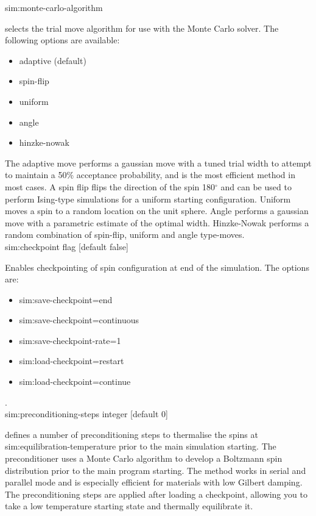 {\zicf sim:monte-carlo-algorithm} selects the trial move algorithm for use with the Monte Carlo solver. The following options are available:
\begin{itemize}
  \item[] adaptive (default)
  \item[] spin-flip
  \item[] uniform
  \item[] angle
  \item[] hinzke-nowak
\end{itemize}
The adaptive move performs a gaussian move with a tuned trial width to attempt to maintain a 50\% acceptance probability, and is the most efficient method in most cases. A spin flip flips the direction of the spin 180$^{\circ}$ and can be used to perform Ising-type simulations for a uniform starting configuration. Uniform moves a spin to a random location on the unit sphere. Angle performs a gaussian move with a parametric estimate of the optimal width. Hinzke-Nowak performs a random combination of spin-flip, uniform and angle type-moves.\\

{\zicf sim:checkpoint flag [default false]}
    Enables checkpointing of spin configuration at end of the simulation. The options are:

\begin{itemize}
  \item[] sim:save-checkpoint=end
  \item[] sim:save-checkpoint=continuous
  \item[] sim:save-checkpoint-rate=1
  \item[] sim:load-checkpoint=restart
  \item[] sim:load-checkpoint=continue
\end{itemize}
.\\

{\zicf sim:preconditioning-steps
    integer [default 0]}
    defines a number of preconditioning steps to thermalise the spins at
    sim:equilibration-temperature prior to the main simulation starting. The
    preconditioner uses a Monte Carlo algorithm to develop a Boltzmann spin
    distribution prior to the main program starting. The method works in serial
    and parallel mode and is especially efficient for materials with low Gilbert
    damping. The preconditioning steps are applied after loading a checkpoint,
    allowing you to take a low temperature starting state and thermally
    equilibrate it.\\

